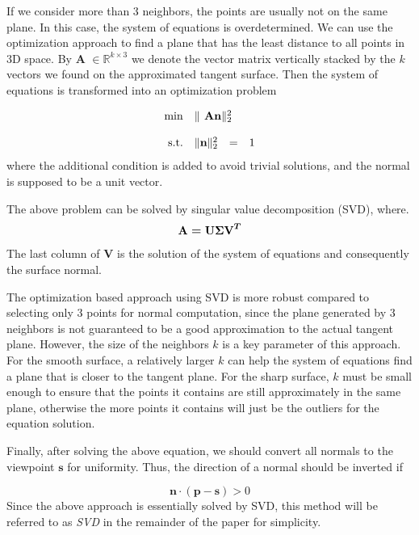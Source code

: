 If we consider more than 3 neighbors, the points are usually not on the same plane. In this case, the system of equations is overdetermined. We can use the optimization approach to find a plane that has the least distance to all points in 3D space. By $ \textbf{A }\in \mathbb{R}^{k\times 3} $ we denote the vector matrix vertically stacked by the $ k $ vectors we found on the approximated tangent surface. Then the system of equations is transformed into an optimization problem 



\begin{equation}
	\begin{array}{rrclcl}
		\displaystyle \min & \multicolumn{3}{l}{\|\textbf{ A}  \bn \|^2_2} \\
		\\
		\textrm{s.t.} & \| \bn \|^2_2 & = & 1 
	\end{array}
\end{equation}
where the additional condition is added to avoid trivial solutions, and the normal is supposed to be a unit vector.

The above problem can be solved by singular value decomposition (SVD), where.
\[ \textbf{A}= \textbf{U}\boldmath{\Sigma} \textbf{V}^T \]
The last column of $ \textbf{V} $ is the solution of the system of equations and consequently the surface normal. 

The optimization based approach using SVD is more robust compared to selecting only 3 points for normal computation, since the plane generated by 3 neighbors is not guaranteed to be a good approximation to the actual tangent plane. However, the size of the neighbors $ k $ is a key parameter of this approach. For the smooth surface, a relatively larger $ k $ can help the system of equations find a plane that is closer to the tangent plane. For the sharp surface, $ k $ must be small enough to ensure that the points it contains are still approximately in the same plane, otherwise the more points it contains will just be the outliers for the equation solution. 

Finally, after solving the above equation, we should convert all normals to the viewpoint $ \textbf{s} $ for uniformity. Thus, the direction of a normal should be inverted if 


\begin{equation}\label{eq:normal-invertion}
	\textbf{n} \cdot (\textbf{p}  - \textbf{s}) > 0
\end{equation}
Since the above approach is essentially solved by SVD, this method will be referred to as \textit{SVD} in the remainder of the paper for simplicity.

